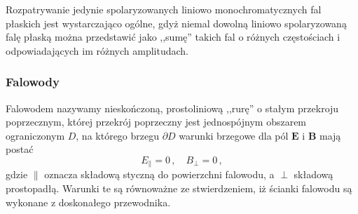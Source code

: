 \documentclass[../main.tex]{subfiles}
\begin{document}
Rozpatrywanie jedynie spolaryzowanych liniowo monochromatycznych fal płaskich jest wystarczająco ogólne, gdyż niemal dowolną liniowo spolaryzowaną falę płaską można przedstawić jako ,,sumę'' takich fal o różnych częstościach i odpowiadających im różnych amplitudach.

\subsubsection{Falowody}
Falowodem nazywamy nieskończoną, prostoliniową ,,rurę'' o stałym przekroju poprzecznym, której przekrój poprzeczny jest jednospójnym obszarem ograniczonym \(D\), na którego brzegu \(\partial D\) warunki brzegowe dla pól \(\mathbf{E}\) i \(\mathbf{B}\) mają postać
\begin{equation*}
    E_\parallel=0\,,\quad B_\perp=0\,,
\end{equation*}
gdzie \(\parallel\) oznacza składową styczną do powierzchni falowodu, a \(\perp\) składową prostopadłą. Warunki te są równoważne ze stwierdzeniem, iż ścianki falowodu są wykonane z doskonałego przewodnika.
\medskip
\end{document}
